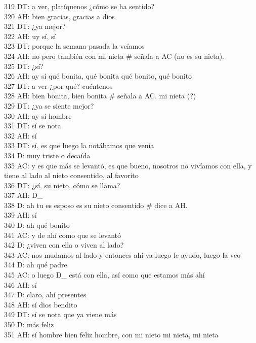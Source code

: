319 DT: a ver, platíquenos ¿cómo se ha sentido?\\
320 AH: bien gracias, gracias a dios\\
321 DT: ¿ya mejor?\\
322 AH: uy sí, sí\\
323 DT: porque la semana pasada la veíamos\\
324 AH: no pero también con mi nieta \# señala a AC (no es su nieta).\\
325 DT: ¿sí?\\
326 AH: ay sí qué bonita, qué bonita qué bonito, qué bonito\\
327 DT: a ver ¿por qué? cuéntenos\\
328 AH: bien bonita, bien bonita \# señala a AC. mi nieta (?)\\
329 DT: ¿ya se siente mejor?\\
330 AH: ay sí hombre\\
331 DT: sí se nota\\
332 AH: sí\\
333 DT: sí, es que luego la notábamos que venía\\
334 D: muy triste o decaída\\
335 AC: y es que más se levantó, es que bueno, nosotros no vivíamos con ella, y tiene al lado al nieto consentido, al favorito\\
336 DT: ¿sí, su nieto, cómo se llama?\\
337 AH: D\_\\
338 D: ah tu es esposo es su nieto consentido \# dice a AH.\\
339 AH: sí\\
340 D: ah qué bonito\\
341 AC: y de ahí como que se levantó\\
342 D: ¿viven con ella o viven al lado?\\
343 AC: nos mudamos al lado y entonces ahí ya luego le ayudo, luego la veo\\
344 D: ah qué padre\\
345 AC: o luego D\_ está con ella, así como que estamos más ahí\\
346 AH: sí\\
347 D: claro, ahí presentes\\
348 AH: sí dios bendito\\
349 DT: sí se nota que ya viene más\\
350 D: más feliz\\
351 AH: sí hombre bien feliz hombre, con mi nieto mi nieta, mi nieta\\
